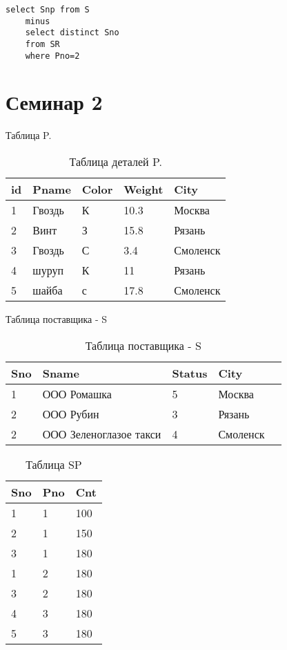 \begin{lstlisting}[label=some-code,caption=Пример 5]
	select Snp from S
	minus
	select distinct Sno
	from SR
	where Pno=2
\end{lstlisting}


\chapter{Семинар 2}

Таблица P.

\begin{table}[ht]
	\centering
	\begin{tabular}{ | l | l | l | l |l |}
		\hline
		id & Pname  & Color & Weight & City     \\ \hline
		1  & Гвоздь & К     & 10.3   & Москва   \\ \hline
		2  & Винт   & З     & 15.8   & Рязань   \\ \hline
		3  & Гвоздь & С     & 3.4    & Смоленск \\ \hline
		4  & шуруп  & К     & 11     & Рязань   \\ \hline
		5  & шайба  & с     & 17.8   & Смоленск \\ \hline
		\hline
	\end{tabular}
	\caption{Таблица деталей P.}
\end{table}

Таблица поставщика - S

\begin{table}[ht]
	\centering
	\begin{tabular}{ | l | l | l | l |l |}
		\hline
		Sno & Sname                  & Status & City     \\ \hline
		1   & ООО Ромашка            & 5      & Москва   \\ \hline
		2   & ООО Рубин              & 3      & Рязань   \\ \hline
		2   & ООО Зеленоглазое такси & 4      & Смоленск \\ \hline
		\hline
	\end{tabular}
	\caption{Таблица поставщика - S}
	\label{table:ref1}
\end{table}


\begin{table}[ht]
	\centering
	\begin{tabular}{ | l | l | l |}
		\hline
		Sno & Pno & Cnt \\ \hline
		1   & 1   & 100 \\ \hline
		2   & 1   & 150 \\ \hline
		3   & 1   & 180 \\ \hline
		1   & 2   & 180 \\ \hline
		3   & 2   & 180 \\ \hline
		4   & 3   & 180 \\ \hline
		5   & 3   & 180 \\ \hline
		\hline
	\end{tabular}
	\caption{Таблица SP}
	\label{table:ref1}
\end{table}


